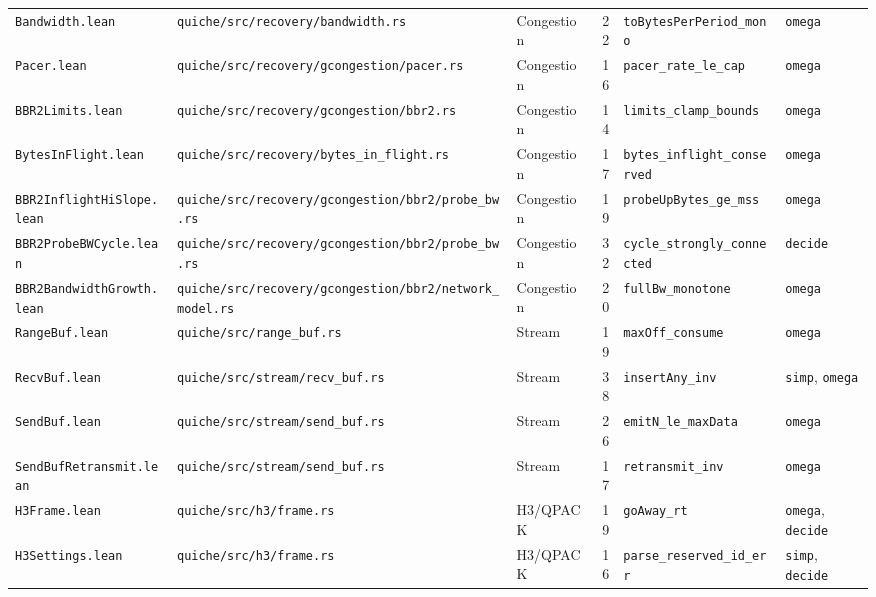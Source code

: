\documentclass[sigconf,10pt]{acmart}
\begin{document}
\begin{table}[t]
\begin{tabular}{lllrll}
\texttt{Bandwidth.lean}         & \texttt{quiche/src/recovery/bandwidth.rs}     & Congestion & 22 & \texttt{toBytesPerPeriod\_mono} & \texttt{omega} \\
\texttt{Pacer.lean}             & \texttt{quiche/src/recovery/gcongestion/pacer.rs} & Congestion & 16 & \texttt{pacer\_rate\_le\_cap} & \texttt{omega} \\
\texttt{BBR2Limits.lean}        & \texttt{quiche/src/recovery/gcongestion/bbr2.rs}  & Congestion & 14 & \texttt{limits\_clamp\_bounds} & \texttt{omega} \\
\texttt{BytesInFlight.lean}     & \texttt{quiche/src/recovery/bytes\_in\_flight.rs} & Congestion & 17 & \texttt{bytes\_inflight\_conserved} & \texttt{omega} \\
\texttt{BBR2InflightHiSlope.lean} & \texttt{quiche/src/recovery/gcongestion/bbr2/probe\_bw.rs} & Congestion & 19 & \texttt{probeUpBytes\_ge\_mss} & \texttt{omega} \\
\texttt{BBR2ProbeBWCycle.lean}  & \texttt{quiche/src/recovery/gcongestion/bbr2/probe\_bw.rs} & Congestion & 32 & \texttt{cycle\_strongly\_connected} & \texttt{decide} \\
\texttt{BBR2BandwidthGrowth.lean} & \texttt{quiche/src/recovery/gcongestion/bbr2/network\_model.rs} & Congestion & 20 & \texttt{fullBw\_monotone} & \texttt{omega} \\
\midrule
\texttt{RangeBuf.lean}          & \texttt{quiche/src/range\_buf.rs}             & Stream  & 19  & \texttt{maxOff\_consume}             & \texttt{omega} \\
\texttt{RecvBuf.lean}           & \texttt{quiche/src/stream/recv\_buf.rs}       & Stream  & 38  & \texttt{insertAny\_inv}              & \texttt{simp}, \texttt{omega} \\
\texttt{SendBuf.lean}           & \texttt{quiche/src/stream/send\_buf.rs}       & Stream  & 26  & \texttt{emitN\_le\_maxData}          & \texttt{omega} \\
\texttt{SendBufRetransmit.lean} & \texttt{quiche/src/stream/send\_buf.rs}       & Stream  & 17  & \texttt{retransmit\_inv}             & \texttt{omega} \\
\midrule
\texttt{H3Frame.lean}           & \texttt{quiche/src/h3/frame.rs}               & H3/QPACK& 19  & \texttt{goAway\_rt}                  & \texttt{omega}, \texttt{decide} \\
\texttt{H3Settings.lean}        & \texttt{quiche/src/h3/frame.rs}               & H3/QPACK& 16  & \texttt{parse\_reserved\_id\_err}    & \texttt{simp}, \texttt{decide} \\

\end{tabular}
\end{table}
\end{document}
